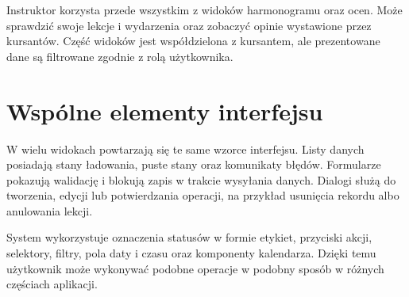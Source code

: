 Instruktor korzysta przede wszystkim z widoków harmonogramu oraz ocen. Może sprawdzić swoje lekcje i wydarzenia oraz zobaczyć opinie wystawione przez kursantów. Część widoków jest współdzielona z kursantem, ale prezentowane dane są filtrowane zgodnie z rolą użytkownika.

\section{Wspólne elementy interfejsu}
\label{sec:gui-wspolne-elementy}

W wielu widokach powtarzają się te same wzorce interfejsu. Listy danych posiadają stany ładowania, puste stany oraz komunikaty błędów. Formularze pokazują walidację i blokują zapis w trakcie wysyłania danych. Dialogi służą do tworzenia, edycji lub potwierdzania operacji, na przykład usunięcia rekordu albo anulowania lekcji.

System wykorzystuje oznaczenia statusów w formie etykiet, przyciski akcji, selektory, filtry, pola daty i czasu oraz komponenty kalendarza. Dzięki temu użytkownik może wykonywać podobne operacje w podobny sposób w różnych częściach aplikacji.
